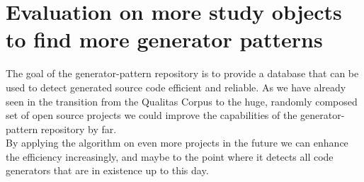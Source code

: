\section{Evaluation on more study objects to find more generator patterns}
The goal of the generator-pattern repository is to provide a database that can be used to detect generated source code efficient and reliable. As we have already seen in the transition from the Qualitas Corpus to the huge, randomly composed set of open source projects we could improve the capabilities of the generator-pattern repository by far.\\
By applying the algorithm on even more projects in the future we can enhance the efficiency increasingly, and maybe to the point where it detects all code generators that are in existence up to this day.